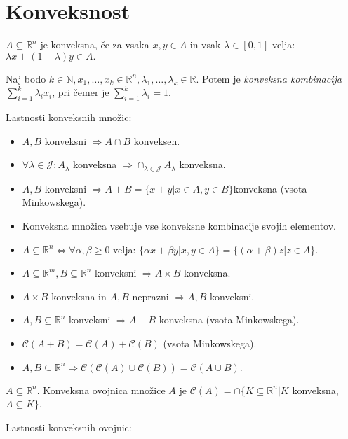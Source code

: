 \documentclass[10pt,a4paper]{amsart}
\theoremstyle{definition} %
\theoremstyle{plain} %
\newcommand{\R}{\mathbb R}
\newcommand{\N}{\mathbb N}
\begin{document}
\setlength{\parindent}{0pt}
\section{Konveksnost}

 $A \subseteq \R^n$ je konveksna, če za vsaka $x,y \in A$ in vsak $\lambda  \in [0,1]$ velja: $\lambda x + (1-\lambda )y \in A.$

Naj bodo $k\in \N ,x_1,\dots ,x_k \in \R^n , \lambda_1 ,\dots , \lambda_k \in \R$. Potem je \emph{konveksna kombinacija} $\sum \limits_{i=1}^{k} \lambda_i x_i$, pri čemer je $\sum \limits_{i=1}^{k} \lambda_i = 1$.

 Lastnosti konveksnih množic:

\begin{itemize}
\item $A,B$ konveksni $\Longrightarrow A \cap B$ konveksen.
\item $\forall  \lambda \in \mathcal{J} : A_{\lambda}$ konveksna $\Longrightarrow \cap_{\lambda \in \mathcal{J}} A_{\lambda}$ konveksna.
\item $A,B$  konveksni $ \Longrightarrow A+B = \{ x+y | x\in A, y \in B\} $konveksna (vsota Minkowskega).
\item Konveksna množica vsebuje vse konveksne kombinacije svojih elementov.
\item $A \subseteq \R^n \Longleftrightarrow \forall \alpha , \beta \geq 0$ velja: $\{ \alpha x + \beta y | x,y \in A\} = \{(\alpha + \beta )z | z \in A \}. $
\item $A \subseteq \R^m , B \subseteq \R^n$ konveksni $\Longrightarrow A \times B$ konveksna.
\item $ A \times B$ konveksna in $A,B$ neprazni  $\Longrightarrow A, B$ konveksni.
\item $A,B \subseteq \R^n $ konveksni $\Longrightarrow A+B$ konveksna (vsota Minkowskega).
\item $\mathcal{C}(A+B) = \mathcal{C}(A) + \mathcal{C}(B)$ (vsota Minkowskega).
\item $A,B \subseteq \R^n \Longrightarrow \mathcal{C}(\mathcal{C}(A)\cup \mathcal{C}(B)) = \mathcal{C}(A \cup B).$
\end{itemize}

$A \subseteq \R^n$. Konveksna ovojnica množice $A$ je $\mathcal{C}(A)=\cap \{ K \subseteq \R^n |K$  konveksna, $A \subseteq K\}$.

Lastnosti konveksnih ovojnic:
\end{document}
